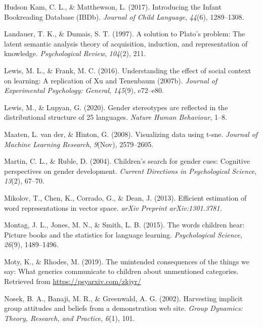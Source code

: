 \documentclass[
  english,
  ,man,floatsintext]{apa6}
\begin{document}
\leavevmode\hypertarget{ref-kam_2017}{}%
Hudson Kam, C. L., \& Matthewson, L. (2017). Introducing the Infant Bookreading Database (IBDb). \emph{Journal of Child Language}, \emph{44}(6), 1289--1308.

\leavevmode\hypertarget{ref-landauer1997solution}{}%
Landauer, T. K., \& Dumais, S. T. (1997). A solution to Plato's problem: The latent semantic analysis theory of acquisition, induction, and representation of knowledge. \emph{Psychological Review}, \emph{104}(2), 211.

\leavevmode\hypertarget{ref-lewis2016understanding}{}%
Lewis, M. L., \& Frank, M. C. (2016). Understanding the effect of social context on learning: A replication of Xu and Tenenbaum (2007b). \emph{Journal of Experimental Psychology: General}, \emph{145}(9), e72--e80.

\leavevmode\hypertarget{ref-lewis2020}{}%
Lewis, M., \& Lupyan, G. (2020). Gender stereotypes are reflected in the distributional structure of 25 languages. \emph{Nature Human Behaviour}, 1--8.

\leavevmode\hypertarget{ref-maaten2008visualizing}{}%
Maaten, L. van der, \& Hinton, G. (2008). Visualizing data using t-sne. \emph{Journal of Machine Learning Research}, \emph{9}(Nov), 2579--2605.

\leavevmode\hypertarget{ref-martin2004children}{}%
Martin, C. L., \& Ruble, D. (2004). Children's search for gender cues: Cognitive perspectives on gender development. \emph{Current Directions in Psychological Science}, \emph{13}(2), 67--70.

\leavevmode\hypertarget{ref-mikolov2013efficient}{}%
Mikolov, T., Chen, K., Corrado, G., \& Dean, J. (2013). Efficient estimation of word representations in vector space. \emph{arXiv Preprint arXiv:1301.3781}.

\leavevmode\hypertarget{ref-montag2015words}{}%
Montag, J. L., Jones, M. N., \& Smith, L. B. (2015). The words children hear: Picture books and the statistics for language learning. \emph{Psychological Science}, \emph{26}(9), 1489--1496.

\leavevmode\hypertarget{ref-moty2019unintended}{}%
Moty, K., \& Rhodes, M. (2019). The unintended consequences of the things we say: What generics communicate to children about unmentioned categories. Retrieved from \url{https://psyarxiv.com/zkjyr/}

\leavevmode\hypertarget{ref-nosek2002harvesting}{}%
Nosek, B. A., Banaji, M. R., \& Greenwald, A. G. (2002). Harvesting implicit group attitudes and beliefs from a demonstration web site. \emph{Group Dynamics: Theory, Research, and Practice}, \emph{6}(1), 101.
\end{document}
